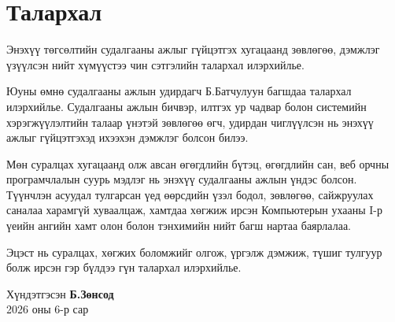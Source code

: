 \newpage
{}
{}
\chapter*{Талархал}
Энэхүү төгсөлтийн судалгааны ажлыг гүйцэтгэх хугацаанд зөвлөгөө, дэмжлэг үзүүлсэн нийт хүмүүстээ чин сэтгэлийн талархал илэрхийлье.

Юуны өмнө судалгааны ажлын удирдагч Б.Батчулуун багшдаа талархал илэрхийлье. Судалгааны ажлын бичвэр, илтгэх ур чадвар болон системийн хэрэгжүүлэлтийн талаар үнэтэй зөвлөгөө өгч, удирдан чиглүүлсэн нь энэхүү ажлыг гүйцэтгэхэд ихээхэн дэмжлэг болсон билээ.

Мөн суралцах хугацаанд олж авсан өгөгдлийн бүтэц, өгөгдлийн сан, веб орчны програмчлалын суурь мэдлэг нь энэхүү судалгааны ажлын үндэс болсон. Түүнчлэн асуудал тулгарсан үед өөрсдийн үзэл бодол, зөвлөгөө, сайжруулах саналаа харамгүй хуваалцаж, хамтдаа хөгжиж ирсэн Компьютерын ухааны I-р үеийн ангийн хамт олон болон тэнхимийн нийт багш нартаа баярлалаа.

Эцэст нь суралцах, хөгжих боломжийг олгож, үргэлж дэмжиж, түшиг тулгуур болж ирсэн гэр бүлдээ гүн талархал илэрхийлье.
\vspace{1.5cm}
\begin{flushright}
  Хүндэтгэсэн \textbf{Б.Зөнсод} \\
  2026 оны 6-р сар
\end{flushright}
